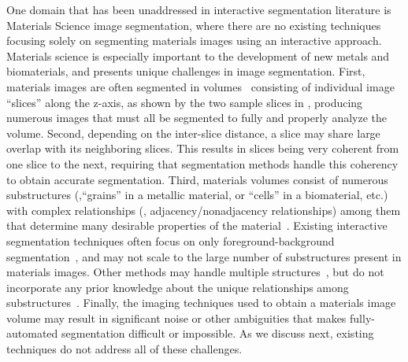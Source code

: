 \documentclass[]{spie}  %
\begin{document}
One domain that has been unaddressed in interactive segmentation
literature is Materials Science image segmentation, where there are no
existing techniques focusing solely on segmenting materials images
using an interactive approach.  Materials science is especially
important to the development of new metals and biomaterials, and
presents unique challenges in image segmentation.  First, materials
images are often segmented in volumes~\cite{ibrahim:91} consisting of
individual image ``slices'' along the z-axis, as shown by the two
sample slices in , producing numerous images that must
all be segmented to fully and properly analyze the volume.  Second,
depending on the inter-slice distance, a slice may share large overlap
with its neighboring slices.  This results in slices being very
coherent from one slice to the next, requiring that segmentation
methods handle this coherency to obtain accurate segmentation.  Third,
materials volumes consist of numerous substructures (\eg,``grains'' in
a metallic material, or ``cells'' in a biomaterial, etc.) with complex
relationships (\eg, adjacency/nonadjacency relationships) among them
that determine many desirable properties of the
material~\cite{swiler:95, rollett:04}.  Existing interactive
segmentation techniques often focus on only foreground-background
segmentation~\cite{rother:04, boykov:01b}, and may not scale to the
large number of substructures present in materials images.  Other
methods may handle multiple structures~\cite{straehle:11,
  straehle:12}, but do not incorporate any prior knowledge about the
unique relationships among substructures~\cite{reed:06, tan:04}.
Finally, the imaging techniques used to obtain a materials image
volume may result in significant noise or other ambiguities that makes
fully-automated segmentation difficult or impossible.  As we discuss
next, existing techniques do not address all of these challenges.
\end{document}
